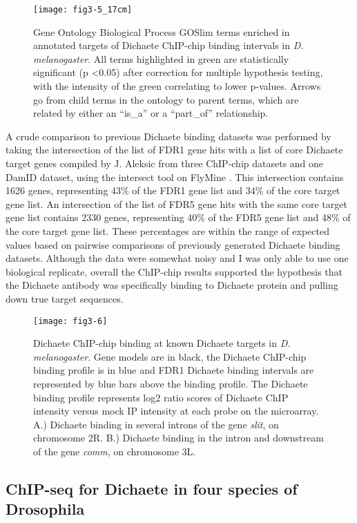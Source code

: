 \begin{figure}
\centering
\texttt{[image: fig3-5\_17cm]}
\caption{Gene Ontology Biological Process GOSlim terms enriched in annotated targets of Dichaete ChIP-chip binding intervals in \emph{D. melanogaster}. All terms highlighted in green are statistically significant (p \textless 0.05) after correction for multiple hypothesis testing, with the intensity of the green correlating to lower p-values. Arrows go from child terms in the ontology to parent terms, which are related by either an “is\_a” or a “part\_of” relationship.}
\label{Figure 3.5}
\end{figure}

A crude comparison to previous Dichaete binding datasets was performed by taking the intersection of the list of FDR1 gene hits with a list of core Dichaete target genes compiled by J. Aleksic from three ChIP-chip datasets and one DamID dataset, using the intersect tool on FlyMine \citep{aleksic_role_2013,lyne_flymine:_2007}. This intersection contains 1626 genes, representing 43\% of the FDR1 gene list and 34\% of the core target gene list. An intersection of the list of FDR5 gene hits with the same core target gene list contains 2330 genes, representing 40\% of the FDR5 gene list and 48\% of the core target gene list. These percentages are within the range of expected values based on pairwise comparisons of previously generated Dichaete binding datasets. Although the data were somewhat noisy and I was only able to use one biological replicate, overall the ChIP-chip results supported the hypothesis that the Dichaete antibody was specifically binding to Dichaete protein and pulling down true target sequences.

\begin{figure}
\centering
\texttt{[image: fig3-6]}
\caption{Dichaete ChIP-chip binding at known Dichaete targets in \emph{D. melanogaster}. Gene models are in black, the Dichaete ChIP-chip binding profile is in blue and FDR1 Dichaete binding intervals are represented by blue bars above the binding profile. The Dichaete binding profile represents log2 ratio scores of Dichaete ChIP intensity versus mock IP intensity at each probe on the microarray. A.) Dichaete binding in several introns of the gene \emph{slit}, on chromosome 2R. B.) Dichaete binding in the intron and downstream of the gene \emph{comm}, on chromosome 3L.}
\label{Figure 3.6}
\end{figure}

\subsection{ChIP-seq for Dichaete in four species of Drosophila}
